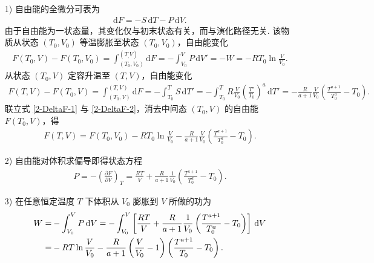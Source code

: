 \documentclass{assignment}
\begin{document}
\begin{sol}
    \begin{itemize}
        \item[1)] 自由能的全微分可表为
        \begin{align}
            \mathrm{d}F=-S\,\mathrm{d}T-P\,\mathrm{d}V.
        \end{align}
        由于自由能为一状态量，其变化仅与初末状态有关，而与演化路径无关. 该物质从状态 $(T_0,V_0)$ 等温膨胀至状态 $(T_0,V_0)$，自由能变化
        \begin{align}
            \label{2-DeltaF-1}
            F(T_0,V)-F(T_0,V_0)=\int_{(T_0,V_0)}^{(T_,V)}\mathrm{d}F=-\int_{V_0}^VP\,\mathrm{d}V'=-W=-RT_0\ln\frac{V}{V_0}.
        \end{align}
        从状态 $(T_0,V)$ 定容升温至 $(T,V)$，自由能变化
        \begin{align}
            \label{2-DeltaF-2}
            F(T,V)-F(T_0,V)=\int_{(T_0,V)}^{(T,V)}\mathrm{d}F=-\int_{T_0}^TS\,\mathrm{d}T'=-\int_{T_0}^TR\frac{V}{V_0}\left(\frac{T'}{T_0}\right)^a\,\mathrm{d}T'=-\frac{R}{a+1}\frac{V}{V_0}\left(\frac{T^{a+1}}{T_0^a}-T_0\right).
        \end{align}
        联立式 \eqref{2-DeltaF-1} 与 \eqref{2-DeltaF-2}，消去中间态 $(T_0,V)$ 的自由能 $F(T_0,V)$，得
        \begin{align}
            F(T,V)=F(T_0,V_0)-RT_0\ln\frac{V}{V_0}-\frac{R}{a+1}\frac{V}{V_0}\left(\frac{T^{a+1}}{T_0^a}-T_0\right).
        \end{align}
        \item[2)] 自由能对体积求偏导即得状态方程
        \begin{align}
            P=-\left(\frac{\partial F}{\partial V}\right)_T=\frac{RT}{V}+\frac{R}{a+1}\frac{1}{V_0}\left(\frac{T^{a+1}}{T_0^a}-T_0\right).
        \end{align}
        \item[3)] 在任意恒定温度 $T$ 下体积从 $V_0$ 膨胀到 $V$ 所做的功为
        \begin{align}
            \notag W=&-\int_{V_0}^VP\,\mathrm{d}V=-\int_{V_0}^V\left[\frac{RT}{V}+\frac{R}{a+1}\frac{1}{V_0}\left(\frac{T^{a+1}}{T_0^a}-T_0\right)\right]\,\mathrm{d}V\\
            =&-RT\ln\frac{V}{V_0}-\frac{R}{a+1}\left(\frac{V}{V_0}-1\right)\left(\frac{T^{a+1}}{T_0}-T_0\right).
        \end{align}
    \end{itemize}
\end{sol}
\end{document}
